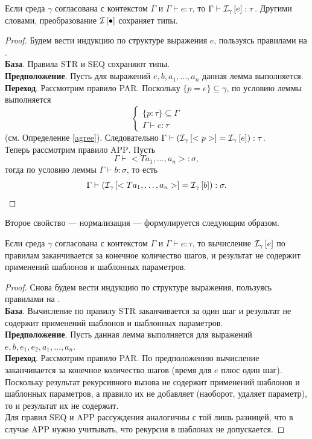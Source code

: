 \begin{Lemm}
Если среда $\gamma$ согласована с контекстом $\Gamma$ и $\Gamma \vdash e : \tau$, то $\Gamma \vdash \mathcal{I}_{\gamma} \left[ e \right] : \tau$. Другими словами, преобразование $\mathcal{I}_{} \left[ \bullet \right]$ сохраняет типы.
\end{Lemm}
\begin{proof}
Будем вести индукцию по структуре выражения $e$, пользуясь правилами на .\\
\textbf{База}. Правила \textsc{STR} и \textsc{SEQ} сохраняют типы.\\
\textbf{Предположение}. Пусть для выражений $e, b, a_1, \ldots, a_n$ данная лемма выполняется.\\
\textbf{Переход}. Рассмотрим правило \textsc{PAR}. Поскольку $\{p = e\} \subseteq \gamma$, по условию леммы выполняется
$$
\left\{\begin{array}{l}		
		\{p : \tau\} \subseteq \Gamma \\
		\Gamma \vdash e : \tau
		\end{array}\right.
$$
(см. Определение \ref{agree}). Следовательно $\Gamma \vdash (\mathcal{I}_{\gamma} \left[ <p> \right] = \mathcal{I}_{\gamma} \left[ e \right]) : \tau$.\\
Теперь рассмотрим правило \textsc{APP}. Пусть $$\Gamma \vdash <T a_1, \ldots, a_n> : \sigma,$$ тогда по условию леммы $\Gamma \vdash b : \sigma$, то есть $$\Gamma \vdash (\mathcal{I}_{\gamma} \left[ <T a_1, \ldots, a_n> \right] = \mathcal{I}_{\gamma} \left[ b \right]) : \sigma.$$
\end{proof}

Второе свойство --- нормализация --- формулируется следующим образом.

\begin{Lemm}
Если среда $\gamma$ согласована с контекстом $\Gamma$ и $\Gamma \vdash e : \tau$, то вычисление $\mathcal{I}_{\gamma} \left[ e \right]$ по правилам  заканчивается за конечное количество шагов, и результат не содержит применений шаблонов и шаблонных параметров.
\end{Lemm}
\begin{proof}
Снова будем вести индукцию по структуре выражения, пользуясь правилами на .\\
\textbf{База}. Вычисление по правилу \textsc{STR} заканчивается за один шаг и результат не содержит применений шаблонов и шаблонных параметров.\\
\textbf{Предположение}. Пусть данная лемма выполняется для выражений $e, b, e_1, e_2, a_1, \ldots, a_n$.\\
\textbf{Переход}. Рассмотрим правило \textsc{PAR}. По предположению вычисление заканчивается за конечное количество шагов (время для $e$ плюс один шаг). Поскольку результат рекурсивного вызова не содержит применений шаблонов и шаблонных параметров, а правило их не добавляет (наоборот, удаляет параметр), то и результат их не содержит.\\
Для правил \textsc{SEQ} и \textsc{APP} рассуждения аналогичны с той лишь разницей, что в случае \textsc{APP} нужно учитывать, что рекурсия в шаблонах не допускается.
\end{proof}

